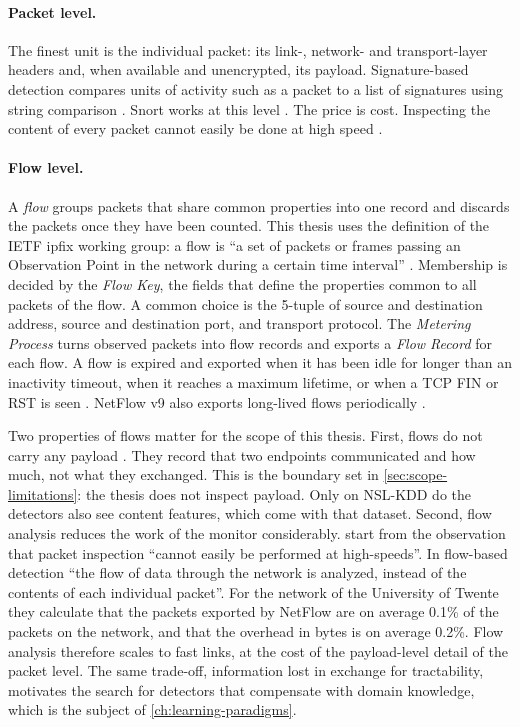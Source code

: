 \paragraph{Packet level.}
The finest unit is the individual packet: its link-, network- and
transport-layer headers and, when available and unencrypted, its payload.
Signature-based detection compares units of activity such as a packet to a
list of signatures using string comparison \citep{scarfone2007nist80094}.
Snort works at this level \citep{roesch1999snort}. The price is cost.
Inspecting the content of every packet cannot easily be done at high speed
\citep{sperotto2010flowbased}.

\paragraph{Flow level.}
A \emph{flow} groups packets that share common properties into one record
and discards the packets once they have been counted. This thesis uses the
definition of the IETF \gls{ipfix} working group: a flow is ``a set of
packets or frames passing an Observation Point in the network during a
certain time interval'' \citep{claise2013rfc7011}. Membership is decided by
the \emph{Flow Key}, the fields that define the properties common to all
packets of the flow. A common choice is the 5-tuple of source and
destination address, source and destination port, and transport protocol.
The \emph{Metering Process} turns observed packets into flow records and
exports a \emph{Flow Record} for each flow. A flow is expired and exported
when it has been idle for longer than an inactivity timeout, when it reaches
a maximum lifetime, or when a TCP FIN or RST is seen
\citep{sperotto2010flowbased}. NetFlow v9 also exports long-lived flows
periodically \citep{claise2004rfc3954}.

Two properties of flows matter for the scope of this thesis. First, flows do
not carry any payload \citep{sperotto2010flowbased}. They record that two
endpoints communicated and how much, not what they exchanged. This is the
boundary set in \cref{sec:scope-limitations}: the thesis does not inspect
payload. Only on NSL-KDD do the detectors also see content features, which
come with that dataset. Second,
flow analysis reduces the work of the monitor considerably.
\citet{sperotto2010flowbased} start from the observation that packet
inspection ``cannot easily be performed at high-speeds''. In flow-based
detection ``the flow of data through the network is analyzed, instead of the
contents of each individual packet''. For the network of the University of
Twente they calculate that the packets exported by NetFlow are on average
0.1\% of the packets on the network, and that the overhead in bytes is on
average 0.2\%. Flow analysis therefore scales to fast links, at the cost of
the payload-level detail of the packet level. The same trade-off,
information lost in exchange for tractability, motivates the search for
detectors that compensate with domain knowledge, which is the subject of
\cref{ch:learning-paradigms}.


